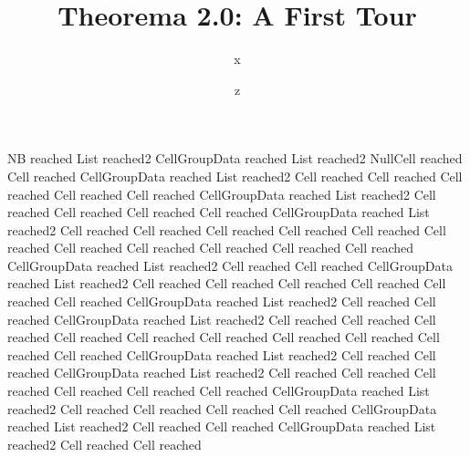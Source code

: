 \documentclass{article}
\begin{document}
% 

\title{Theorema 2.0: A First Tour}
\author{x}
\date{z}
\maketitle

NB reached List reached2 CellGroupData reached List reached2 NullCell reached Cell reached CellGroupData reached List reached2 Cell reached Cell reached Cell reached Cell reached Cell reached CellGroupData reached List reached2 Cell reached Cell reached Cell reached Cell reached CellGroupData reached List reached2 Cell reached Cell reached Cell reached Cell reached Cell reached Cell reached Cell reached Cell reached Cell reached Cell reached Cell reached CellGroupData reached List reached2 Cell reached Cell reached CellGroupData reached List reached2 Cell reached Cell reached Cell reached Cell reached Cell reached Cell reached CellGroupData reached List reached2 Cell reached Cell reached CellGroupData reached List reached2 Cell reached Cell reached Cell reached Cell reached Cell reached Cell reached Cell reached Cell reached Cell reached Cell reached CellGroupData reached List reached2 Cell reached Cell reached CellGroupData reached List reached2 Cell reached Cell reached Cell reached Cell reached Cell reached Cell reached CellGroupData reached List reached2 Cell reached Cell reached Cell reached Cell reached CellGroupData reached List reached2 Cell reached Cell reached CellGroupData reached List reached2 Cell reached Cell reached 
\end{document}
